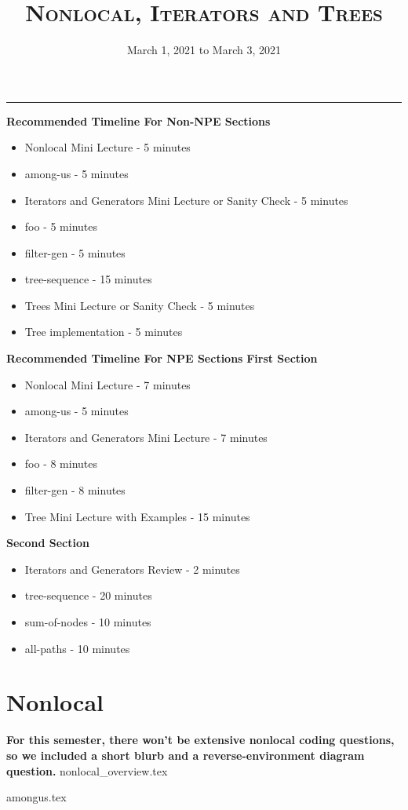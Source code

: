 \documentclass{exam}
\title{\textsc{Nonlocal, Iterators and Trees}}
\date{March 1, 2021 to March 3, 2021}
\begin{document}
	\maketitle
	\rule{\textwidth}{0.15em}
	\fontsize{12}{15}\selectfont

\begin{guide}
	\textbf{Recommended Timeline For Non-NPE Sections}
	\begin{itemize}
		\item Nonlocal Mini Lecture - 5 minutes
		\item among-us - 5 minutes
		\item Iterators and Generators Mini Lecture or Sanity Check - 5 minutes
		\item foo - 5 minutes
		\item filter-gen - 5 minutes
		\item tree-sequence - 15 minutes
		\item Trees Mini Lecture or Sanity Check - 5 minutes
		\item Tree implementation - 5 minutes
	\end{itemize}
	\textbf{Recommended Timeline For NPE Sections}
	\textbf{First Section}
	\begin{itemize}
		\item Nonlocal Mini Lecture - 7 minutes
		\item among-us - 5 minutes
		\item Iterators and Generators Mini Lecture - 7 minutes
		\item foo - 8 minutes
		\item filter-gen - 8 minutes
		\item Tree Mini Lecture with Examples - 15 minutes
	\end{itemize}
	\textbf{Second Section}
	\begin{itemize}
		\item Iterators and Generators Review - 2 minutes
		\item tree-sequence - 20 minutes
		\item sum-of-nodes - 10 minutes
		\item all-paths - 10 minutes
	\end{itemize}
\end{guide}

\vspace{-1em}
\section{Nonlocal}
\textbf{For this semester, there won't be extensive nonlocal coding questions, so we included a short blurb and a reverse-environment diagram question.}
\newline
{nonlocal_overview.tex}
\begin{questions}
	{amongus.tex}
\end{questions}
\vspace{-2em}
\end{document}
